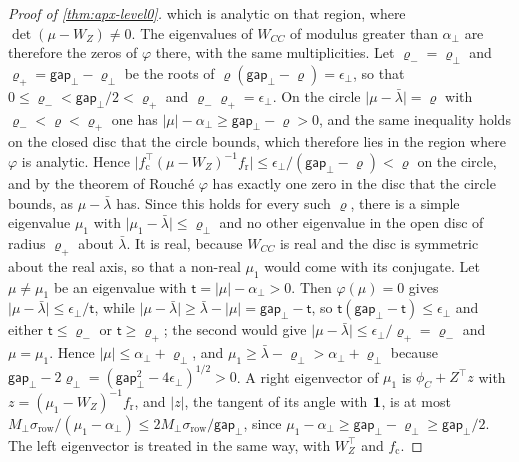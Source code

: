 \begin{proof}[Proof of \cref{thm:apx-level0}]
which is analytic on that region, where $\det(\mu-W_Z)\ne0$. The eigenvalues of $W_{CC}$ of modulus greater than $\alpha_\perp$ are therefore the zeros of $\varphi$ there, with the same multiplicities. Let $\varrho_-=\varrho_\perp$ and $\varrho_+=\mathsf{gap}_\perp-\varrho_\perp$ be the roots of $\varrho(\mathsf{gap}_\perp-\varrho)=\epsilon_\perp$, so that $0\le\varrho_-<\mathsf{gap}_\perp/2<\varrho_+$ and $\varrho_-\varrho_+=\epsilon_\perp$. On the circle $\lvert\mu-\bar\lambda\rvert=\varrho$ with $\varrho_-<\varrho<\varrho_+$ one has $\lvert\mu\rvert-\alpha_\perp\ge\mathsf{gap}_\perp-\varrho>0$, and the same inequality holds on the closed disc that the circle bounds, which therefore lies in the region where $\varphi$ is analytic. Hence $\lvert f_{\mathrm c}^\top(\mu-W_Z)^{-1}f_{\mathrm r}\rvert\le\epsilon_\perp/(\mathsf{gap}_\perp-\varrho)<\varrho$ on the circle, and by the theorem of Rouch\'e $\varphi$ has exactly one zero in the disc that the circle bounds, as $\mu-\bar\lambda$ has. Since this holds for every such $\varrho$, there is a simple eigenvalue $\mu_1$ with $\lvert\mu_1-\bar\lambda\rvert\le\varrho_\perp$ and no other eigenvalue in the open disc of radius $\varrho_+$ about $\bar\lambda$. It is real, because $W_{CC}$ is real and the disc is symmetric about the real axis, so that a non-real $\mu_1$ would come with its conjugate. Let $\mu\ne\mu_1$ be an eigenvalue with $\mathsf t=\lvert\mu\rvert-\alpha_\perp>0$. Then $\varphi(\mu)=0$ gives $\lvert\mu-\bar\lambda\rvert\le\epsilon_\perp/\mathsf t$, while $\lvert\mu-\bar\lambda\rvert\ge\bar\lambda-\lvert\mu\rvert=\mathsf{gap}_\perp-\mathsf t$, so $\mathsf t(\mathsf{gap}_\perp-\mathsf t)\le\epsilon_\perp$ and either $\mathsf t\le\varrho_-$ or $\mathsf t\ge\varrho_+$; the second would give $\lvert\mu-\bar\lambda\rvert\le\epsilon_\perp/\varrho_+=\varrho_-$ and $\mu=\mu_1$. Hence $\lvert\mu\rvert\le\alpha_\perp+\varrho_\perp$, and $\mu_1\ge\bar\lambda-\varrho_\perp>\alpha_\perp+\varrho_\perp$ because $\mathsf{gap}_\perp-2\varrho_\perp=(\mathsf{gap}_\perp^2-4\epsilon_\perp)^{1/2}>0$. A right eigenvector of $\mu_1$ is $\phi_C+Z^\top z$ with $z=(\mu_1-W_Z)^{-1}f_{\mathrm r}$, and $\lvert z\rvert$, the tangent of its angle with $\mathbf{1}$, is at most $M_\perp\sigma_{\mathrm{row}}/(\mu_1-\alpha_\perp)\le2M_\perp\sigma_{\mathrm{row}}/\mathsf{gap}_\perp$, since $\mu_1-\alpha_\perp\ge\mathsf{gap}_\perp-\varrho_\perp\ge\mathsf{gap}_\perp/2$. The left eigenvector is treated in the same way, with $W_Z^\top$ and $f_{\mathrm c}$.
\end{proof}

